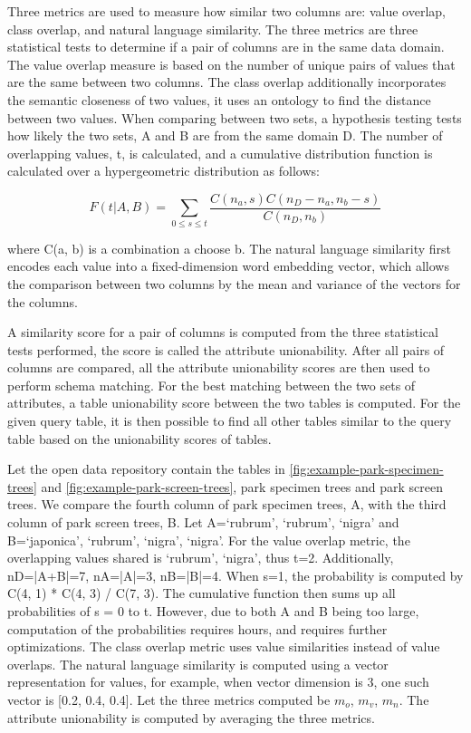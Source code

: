 Three metrics are used to measure how similar two columns are: value overlap, class overlap, and natural language similarity. The three metrics are three statistical tests to determine if a pair of columns are in the same data domain. The value overlap measure is based on the number of unique pairs of values that are the same between two columns. The class overlap additionally incorporates the semantic closeness of two values, it uses an ontology to find the distance between two values. When comparing between two sets, a hypothesis testing tests how likely the two sets, A and B are from the same domain D. The number of overlapping values, t, is calculated, and a cumulative distribution function is calculated over a hypergeometric distribution as follows:

\[
F(t|A,B) = \sum\limits _{0\le s\le t}\frac{C(n_{a},s)C(n_{D}-n_{a},n_{b}-s)}{C(n_{D},n_{b})}
\]


where C(a, b) is a combination a choose b. The natural language similarity first encodes each value into a fixed-dimension word embedding vector, which allows the comparison between two columns by the mean and variance of the vectors for the columns.

A similarity score for a pair of columns is computed from the three statistical tests performed, the score is called the attribute unionability. After all pairs of columns are compared, all the attribute unionability scores are then used to perform schema matching. For the best matching between the two sets of attributes, a table unionability score between the two tables is computed. For the given query table, it is then possible to find all other tables similar to the query table based on the unionability scores of tables.

Let the open data repository contain the tables in \autoref{fig:example-park-specimen-trees} and \autoref{fig:example-park-screen-trees}, park specimen trees and park screen trees. We compare the fourth column of park specimen trees, A, with the third column of park screen trees, B. Let A={`rubrum', `rubrum', `nigra'} and B={`japonica', `rubrum', `nigra', `nigra'}. For the value overlap metric, the overlapping values shared is {`rubrum', `nigra'}, thus t=2. Additionally, nD=|A+B|=7, nA=|A|=3, nB=|B|=4. When s=1, the probability is computed by C(4, 1) * C(4, 3) / C(7, 3). The cumulative function then sums up all probabilities of s = 0 to t. However, due to both A and B being too large, computation of the probabilities requires hours, and requires further optimizations. The class overlap metric uses value similarities instead of value overlaps. The natural language similarity is computed using a vector representation for values, for example, when vector dimension is 3, one such vector is [0.2, 0.4, 0.4]. Let the three metrics computed be {$m_o$, $m_v$, $m_n$}. The attribute unionability is computed by averaging the three metrics.

